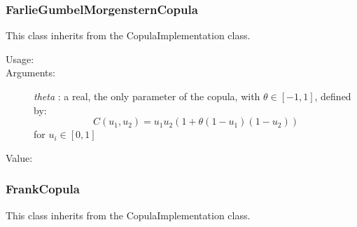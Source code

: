 \newpage
\subsubsection{FarlieGumbelMorgensternCopula}

This class inherits from the CopulaImplementation class.

\begin{description}

\item[Usage:] \rule{0pt}{1em}


\item[Arguments:]  \textit{theta}    : a real, the only parameter of the copula, with $\theta \in [-1,1]$, defined by:
\begin{equation}
C(u_1, u_2)  = \displaystyle u_1u_2 (1 + \theta(1 - u_1)(1 - u_2))
\end{equation}
for $u_i \in [0,1]$

\item[Value:]  \rule{0pt}{1em}

\end{description}

\newpage
\subsubsection{FrankCopula}

This class inherits from the CopulaImplementation class.


